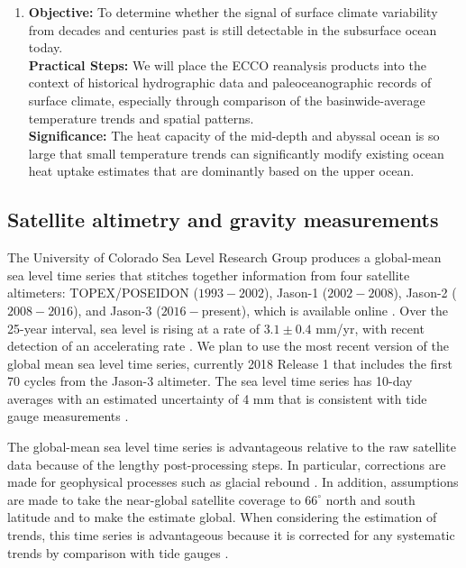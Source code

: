 \documentclass[authoryear,round,12pt]{article}
\begin{document}
\begin{enumerate}
 \item \textbf{Objective:} To determine whether the signal of surface climate variability from decades and centuries past is still detectable in the subsurface ocean today.
   \\
   \textbf{Practical Steps:} We will place the ECCO reanalysis products into the context of historical hydrographic data and paleoceanographic records of surface climate, especially through comparison of the basinwide-average temperature trends and spatial patterns. 
   \\
   \textbf{Significance:} The heat capacity of the mid-depth and abyssal ocean is so large that small  temperature trends can significantly modify existing ocean heat uptake estimates that are dominantly based on the upper ocean.  

\end{enumerate}






\subsection{Satellite altimetry and gravity measurements}

The University of Colorado Sea Level Research Group  produces a global-mean sea level time series that stitches together information from four satellite altimeters: TOPEX/POSEIDON ($1993-2002$), Jason-1 ($2002-2008$), Jason-2 ($2008-2016$), and Jason-3 ($2016-$present), which is available online \citep{CUSeaLevel--2019:}.
Over the 25-year interval, sea level is rising at a rate of $3.1\pm0.4$ mm/yr, with recent detection of an accelerating rate \citep{Nerem-Beckley-2018:Climate}. We plan to use the most recent version of the global mean sea level time series, currently 2018 Release 1 that includes the first 70 cycles from the Jason-3 altimeter. The sea level time series has 10-day averages with an estimated uncertainty of 4 mm that is consistent with tide gauge measurements \citep[e.g.,][]{Leuliette-Scharroo-2010:Integrating}.

The global-mean sea level time series is advantageous relative to the raw satellite data because of the lengthy post-processing steps. In particular, corrections are made for geophysical processes such as glacial rebound \citep{Nerem-Chambers-2010:Estimating}. In addition, assumptions are made to take the near-global satellite coverage to $66^{\circ}$ north and south latitude and to make the estimate global. When considering the estimation of trends, this time series is advantageous because it is corrected for any systematic trends by comparison with tide gauges \citep{Mitchum--2000:Improved}.
\end{document}
